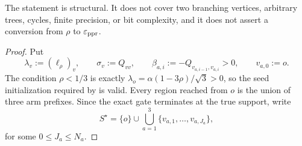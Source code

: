 \begin{theorem}
The statement is structural.  It does not cover two branching vertices,
arbitrary trees, cycles, finite precision, or bit complexity, and it does not
assert a conversion from $\rho$ to $\varepsilon_{\mathrm{ppr}}$.
\end{theorem}

\begin{proof}
Put
\begin{equation*}
 \lambda_v:=(\ell_\rho)_v,
 \qquad
 \sigma_v:=Q_{vv},
 \qquad
 \beta_{a,i}:=-Q_{v_{a,i-1},v_{a,i}}>0,
 \qquad v_{a,0}:=o.
\end{equation*}
The condition $\rho<1/3$ is exactly
$\lambda_o=\alpha(1-3\rho)/\sqrt3>0$, so the seed initialization required by
 is valid.  Every region reached from $o$ is
the union of three arm prefixes.  Since the exact gate terminates at the true
support, write
\begin{equation}
 S^\star
 =\{o\}\cup
  \bigcup_{a=1}^3\{v_{a,1},\ldots,v_{a,J_a}\},
 \label{eq:spider-support-prefixes}
\end{equation}
for some $0\leq J_a\leq N_a$.


\end{proof}
